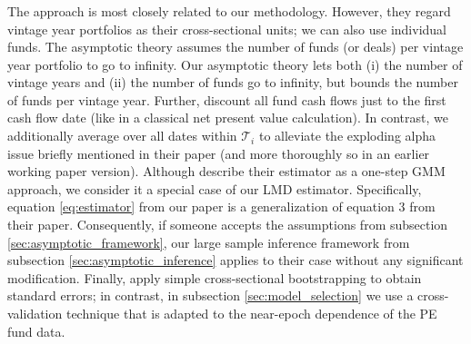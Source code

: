 \documentclass[12pt]{article}
\begin{document}
\subsubsection{\cite{DLP12}}

The \cite{DLP12} approach is most closely related to our methodology.
However, they regard vintage year portfolios as their cross-sectional units; we can also use individual funds.
The \cite{DLP12} asymptotic theory assumes the number of funds (or deals) per vintage year portfolio to go to infinity.
Our asymptotic theory lets both (i) the number of vintage years and (ii) the number of funds go to infinity, but bounds the number of funds per vintage year.
Further, \cite{DLP12} discount all fund cash flows just to the first cash flow date (like in a classical net present value calculation).
In contrast, we additionally average over all dates within $\mathcal{T}_{i}$ to alleviate the exploding alpha issue briefly mentioned in their paper (and more thoroughly so in an earlier working paper version).
Although \cite{DLP12} describe their estimator as a one-step GMM approach, we consider it a special case of our LMD estimator.
Specifically, equation \ref{eq:estimator} from our paper is a generalization of equation 3 from their paper.
Consequently, if someone accepts the assumptions from subsection \ref{sec:asymptotic_framework}, our large sample inference framework from subsection \ref{sec:asymptotic_inference} applies to their case without any significant modification.
Finally, \cite{DLP12} apply simple cross-sectional bootstrapping to obtain standard errors; in contrast, in subsection \ref{sec:model_selection} we use a cross-validation technique that is adapted to the near-epoch dependence of the PE fund data.

\subsubsection{\cite{KN16}}
\end{document}
